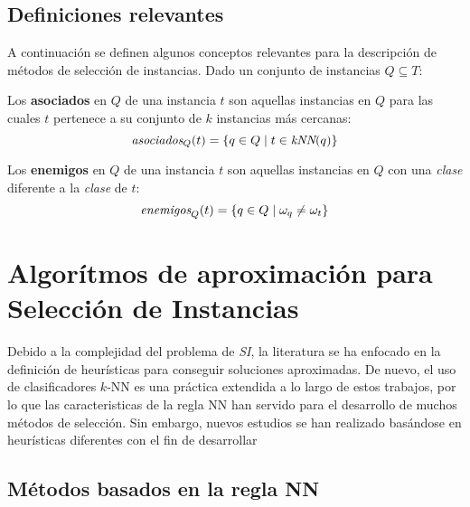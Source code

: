 \subsection{Definiciones relevantes}

A continuación se definen algunos conceptos relevantes para la descripción de métodos de selección de instancias. Dado un conjunto de instancias $Q \subseteq T$:

\begin{definicion}
Los \textbf{asociados} en $Q$ de una instancia $t$ son aquellas instancias en $Q$ para las cuales $t$ pertenece a su conjunto de $k$ instancias más cercanas:
\begin{equation}
\emph{asociados}_Q(t) = \left\lbrace q \in Q \mid t\in \emph{kNN}(q) \right\rbrace
\end{equation}
\end{definicion}

\begin{definicion}
Los \textbf{enemigos} en $Q$ de una instancia $t$ son aquellas instancias en $Q$ con una \emph{clase} diferente a la \emph{clase} de $t$:
\begin{equation}
\emph{enemigos}_Q(t) = \left\lbrace q \in Q \mid \omega_{q} \neq \omega_{t} \right\rbrace
\end{equation}
\end{definicion}

\section{Algorítmos de aproximación para Selección de Instancias}

Debido a la complejidad del problema de \emph{SI}, la literatura se ha enfocado en la definición de heurísticas para conseguir soluciones aproximadas. De nuevo, el uso de clasificadores $k$-NN es una práctica extendida a lo largo de estos trabajos, por lo que las caracteristicas de la regla NN han servido para el desarrollo de muchos métodos de selección. Sin embargo, nuevos estudios se han realizado basándose en heurísticas diferentes con el fin de desarrollar 

\subsection{Métodos basados en la regla NN}

